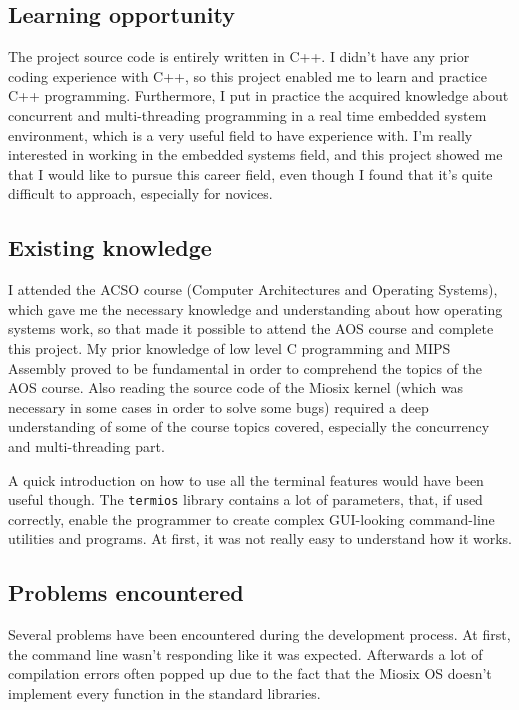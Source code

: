 \documentclass[10pt]{article}
\begin{document}
    \subsection{Learning opportunity}

    The project source code is entirely written in C++. I didn't have any prior coding experience with C++, so this project enabled me to learn and practice C++ programming.
    Furthermore, I put in practice the acquired knowledge about concurrent and multi-threading programming in a real time embedded system environment, which is a very useful field to have experience with.
    I'm really interested in working in the embedded systems field, and this project showed me that I would like to pursue this career field, even though I found that it's quite difficult to approach, especially for novices.

    \subsection{Existing knowledge}

    I attended the ACSO course (Computer Architectures and Operating Systems), which gave me the necessary knowledge and understanding about how operating systems work, so that made it possible to attend the AOS course and complete this project.
    My prior knowledge of low level C programming and MIPS Assembly proved to be fundamental in order to comprehend the topics of the AOS course. Also reading the source code of the Miosix kernel (which was necessary in some cases in order to solve some bugs) required a deep understanding of some of the course topics covered, especially the concurrency and multi-threading part.

    A quick introduction on how to use all the terminal features would have been useful though. The \verb|termios| library contains a lot of parameters, that, if used correctly, enable the programmer to create complex GUI-looking command-line utilities and programs. At first, it was not really easy to understand how it works.

    \subsection{Problems encountered}
    Several problems have been encountered during the development process. At first, the command line wasn't responding like it was expected. Afterwards a lot of compilation errors often popped up due to the fact that the Miosix OS doesn't implement every function in the standard libraries.
\end{document}
